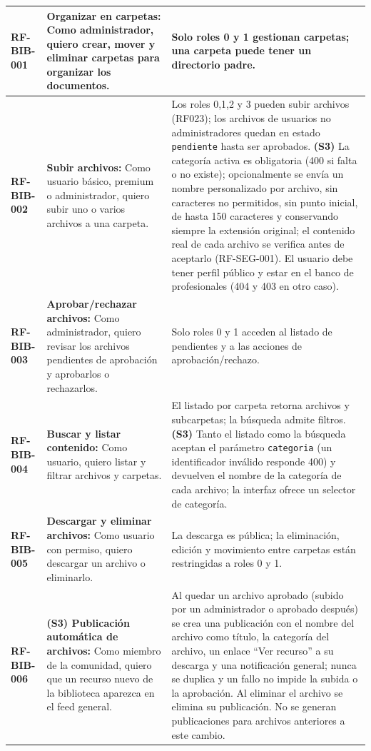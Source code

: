 \begin{longtable}{|l||p{7cm}|p{4.5cm}|}
\textbf{RF-BIB-001} & \textbf{Organizar en carpetas:} Como administrador, quiero crear, mover y eliminar carpetas para organizar los documentos. & Solo roles 0 y 1 gestionan carpetas; una carpeta puede tener un directorio padre. \\
\hline
\textbf{RF-BIB-002} & \textbf{Subir archivos:} Como usuario básico, premium o administrador, quiero subir uno o varios archivos a una carpeta. & Los roles 0,1,2 y 3 pueden subir archivos (RF023); los archivos de usuarios no administradores quedan en estado \texttt{pendiente} hasta ser aprobados. \textbf{(S3)} La categoría activa es obligatoria (400 si falta o no existe); opcionalmente se envía un nombre personalizado por archivo, sin caracteres no permitidos, sin punto inicial, de hasta 150 caracteres y conservando siempre la extensión original; el contenido real de cada archivo se verifica antes de aceptarlo (RF-SEG-001). El usuario debe tener perfil público y estar en el banco de profesionales (404 y 403 en otro caso). \\
\hline
\textbf{RF-BIB-003} & \textbf{Aprobar/rechazar archivos:} Como administrador, quiero revisar los archivos pendientes de aprobación y aprobarlos o rechazarlos. & Solo roles 0 y 1 acceden al listado de pendientes y a las acciones de aprobación/rechazo. \\
\hline
\textbf{RF-BIB-004} & \textbf{Buscar y listar contenido:} Como usuario, quiero listar y filtrar archivos y carpetas. & El listado por carpeta retorna archivos y subcarpetas; la búsqueda admite filtros. \textbf{(S3)} Tanto el listado como la búsqueda aceptan el parámetro \texttt{categoria} (un identificador inválido responde 400) y devuelven el nombre de la categoría de cada archivo; la interfaz ofrece un selector de categoría. \\
\hline
\textbf{RF-BIB-005} & \textbf{Descargar y eliminar archivos:} Como usuario con permiso, quiero descargar un archivo o eliminarlo. & La descarga es pública; la eliminación, edición y movimiento entre carpetas están restringidas a roles 0 y 1. \\
\hline
\textbf{RF-BIB-006} & \textbf{(S3) Publicación automática de archivos:} Como miembro de la comunidad, quiero que un recurso nuevo de la biblioteca aparezca en el feed general. & Al quedar un archivo aprobado (subido por un administrador o aprobado después) se crea una publicación con el nombre del archivo como título, la categoría del archivo, un enlace ``Ver recurso'' a su descarga y una notificación general; nunca se duplica y un fallo no impide la subida o la aprobación. Al eliminar el archivo se elimina su publicación. No se generan publicaciones para archivos anteriores a este cambio. \\
\end{longtable}

